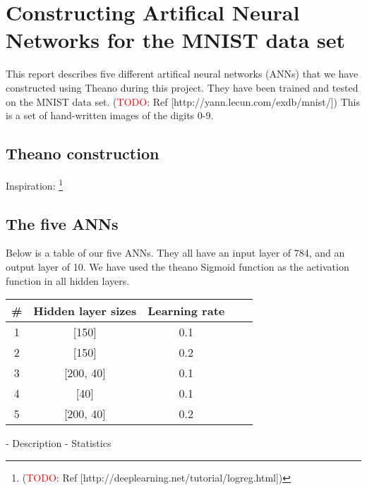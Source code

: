 
\section{Constructing Artifical Neural Networks for the MNIST data set}
This report describes five different artifical neural networks (ANNs)
that we have constructed using Theano during this project. They have
been trained and tested on the MNIST data set.
(\textcolor{red}{TODO}: Ref [http://yann.lecun.com/exdb/mnist/])
This is a set of
hand-written images of the digits 0-9.

\subsection{Theano construction}

Inspiration: \footnote{(\textcolor{red}{TODO}: Ref [http://deeplearning.net/tutorial/logreg.html])}

\subsection{The five ANNs}


Below is a table of our five ANNs. They all have an input layer of 784, and
an output layer of 10. We have used the theano Sigmoid function as the
activation function in all hidden layers.

\begin{center}
  \begin{tabular}{ | c | c | c | c | c | }
    \hline
    \# & Hidden layer sizes & Learning rate \\ \hline
    1 & [150] & 0.1 \\ \hline
    2 & [150] & 0.2 \\ \hline
    3 & [200, 40] & 0.1 \\ \hline
    4 & [40] & 0.1 \\ \hline
    5 & [200, 40] & 0.2 \\
    \hline
  \end{tabular}
\end{center}

- Description
- Statistics
